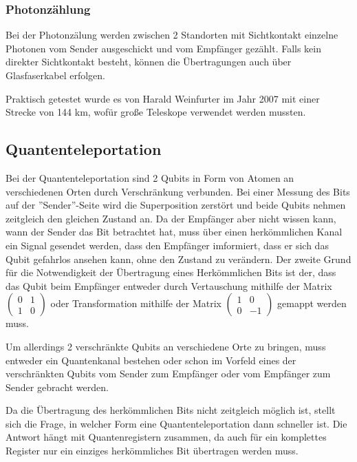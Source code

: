 \subsubsection{Photonzählung}
\label{sec:Photonzaehlung}

Bei der Photonzälung werden zwischen 2 Standorten mit Sichtkontakt einzelne Photonen vom Sender ausgeschickt und vom Empfänger gezählt. Falls kein direkter Sichtkontakt besteht, können die Übertragungen auch über Glasfaserkabel erfolgen.

Praktisch getestet wurde es von Harald Weinfurter im Jahr 2007 mit einer Strecke von 144 km, wofür große Teleskope verwendet werden mussten.


\subsection{Quantenteleportation}
\label{sec:Quantenteleportation}

Bei der Quantenteleportation sind 2 Qubits in Form von Atomen an verschiedenen Orten durch Verschränkung verbunden. Bei einer Messung des Bits auf der ''Sender''-Seite wird die Superposition zerstört und beide Qubits nehmen zeitgleich den gleichen Zustand an. Da der Empfänger aber nicht wissen kann, wann der Sender das Bit betrachtet hat, muss über einen herkömmlichen Kanal ein Signal gesendet werden, dass den Empfänger imformiert, dass er sich das Qubit gefahrlos ansehen kann, ohne den Zustand zu verändern. Der zweite Grund für die Notwendigkeit der Übertragung eines Herkömmlichen Bits ist der, dass das Qubit beim Empfänger entweder durch Vertauschung mithilfe der Matrix $\begin{pmatrix} 
    0 & 1 \\
    1 & 0
\end{pmatrix}$ oder Transformation mithilfe der Matrix $\begin{pmatrix} 
    1 & 0 \\
    0 & -1
\end{pmatrix}$ gemappt werden muss.

Um allerdings 2 verschränkte Qubits an verschiedene Orte zu bringen, muss entweder ein Quantenkanal bestehen oder schon im Vorfeld eines der verschränkten Qubits vom Sender zum Empfänger oder vom Empfänger zum Sender gebracht werden.

Da die Übertragung des herkömmlichen Bits nicht zeitgleich möglich ist, stellt sich die Frage, in welcher Form eine Quantenteleportation dann schneller ist. Die Antwort hängt mit Quantenregistern zusammen, da auch für ein komplettes Register nur ein einziges herkömmliches Bit übertragen werden muss.

